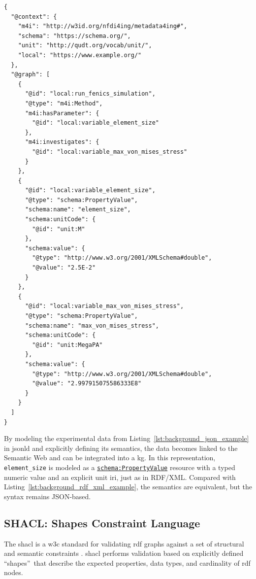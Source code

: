 \begin{lstlisting}[float=htbp,style=json, caption={JSON-LD representation of the simulation result presented in Listing~\ref{lst:background_json_example}}, label={lst:background_jsonld_example}]
{
  "@context": {
    "m4i": "http://w3id.org/nfdi4ing/metadata4ing#",
    "schema": "https://schema.org/",
    "unit": "http://qudt.org/vocab/unit/",
    "local": "https://www.example.org/"
  },
  "@graph": [
    {
      "@id": "local:run_fenics_simulation",
      "@type": "m4i:Method",
      "m4i:hasParameter": {
        "@id": "local:variable_element_size"
      },
      "m4i:investigates": {
        "@id": "local:variable_max_von_mises_stress"
      }
    },
    {
      "@id": "local:variable_element_size",
      "@type": "schema:PropertyValue",
      "schema:name": "element_size",
      "schema:unitCode": {
        "@id": "unit:M"
      },
      "schema:value": {
        "@type": "http://www.w3.org/2001/XMLSchema#double",
        "@value": "2.5E-2"
      }
    },
    {
      "@id": "local:variable_max_von_mises_stress",
      "@type": "schema:PropertyValue",
      "schema:name": "max_von_mises_stress",
      "schema:unitCode": {
        "@id": "unit:MegaPA"
      },
      "schema:value": {
        "@type": "http://www.w3.org/2001/XMLSchema#double",
        "@value": "2.997915075586333E8"
      }
    }
  ]
}
\end{lstlisting}

By modeling the experimental data from Listing~\ref{lst:background_json_example} in \gls{jsonld} and explicitly defining its semantics, the data becomes linked to the Semantic Web and can be integrated into a \gls{kg}. In this representation, \texttt{element\_size} is modeled as a \href{https://schema.org/PropertyValue}{\texttt{schema:PropertyValue}} resource with a typed numeric value and an explicit unit \gls{iri}, just as in RDF/XML. Compared with Listing~\ref{lst:background_rdf_xml_example}, the semantics are equivalent, but the syntax remains JSON-based.

\subsection{SHACL: Shapes Constraint Language}
\label{sec:background:shacl}

The \gls{shacl} is a \gls{w3c} standard for validating \gls{rdf} graphs against a set of structural and semantic constraints \cite{shacl_standard}. \gls{shacl} performs validation based on explicitly defined ``shapes'' \,that describe the expected properties, data types, and cardinality of \gls{rdf} nodes. 

